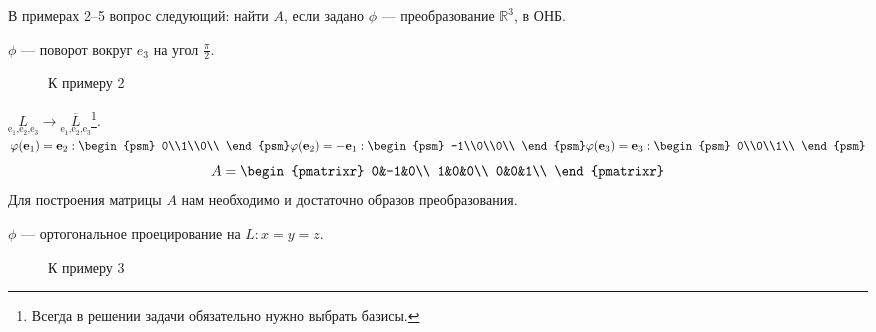 В примерах 2--5 вопрос следующий: найти $A$, если задано $\phi$ --- преобразование $\mathbb{R}^3$, в ОНБ.
\begin{prim}
$\phi$ --- поворот вокруг $\textbf{$e_3$}$ на угол $\frac{\pi}{2}$.
\end{prim}

\begin{wrapfigure}{r}{0.27\linewidth}
	\def\svgwidth{3cm} %
	
	\caption{К примеру 2}
	\label{...}
	\vspace{-9cm}
\end{wrapfigure}

\noindent$\underset{\text{e$_1$,e$_2$,e$_3$}}{L}\rightarrow\underset{\text{e$_1$,e$_2$,e$_3$}}{\overline{L}}$\footnote{Всегда в решении задачи обязательно нужно выбрать базисы.}.\\
$\phi(\textbf{e$_1$})=\textbf{e$_2$}: \begin{psm}
	0\\1\\0\\
\end{psm}\\
\phi(\textbf{e$_2$})=-\textbf{e$_1$}: \begin{psm}
	-1\\0\\0\\
\end{psm}\\
\phi(\textbf{\text{e$_3$}})=\textbf{e$_3$}:\begin{psm}
	0\\0\\1\\
\end{psm}$\\
$$A=\begin{pmatrixr}
	0&-1&0\\
	1&0&0\\
	0&0&1\\	
\end{pmatrixr}$$
Для построения матрицы $A$ нам необходимо и достаточно образов преобразования.
\begin{prim}
	$\phi$ --- ортогональное проецирование на $L: x=y=z$.
\end{prim}

\begin{wrapfigure}{r}{0.35\linewidth}
	\def\svgwidth{6cm} %
	
	\caption{К примеру 3}
	\label{...}
	\vspace{-9cm}
\end{wrapfigure}

